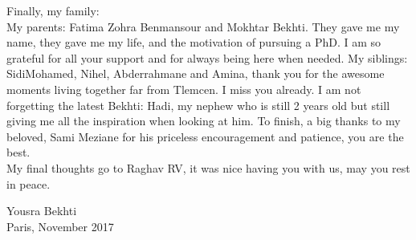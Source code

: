 \begin{acknowledgements}
Finally, my family: \\
My parents: Fatima Zohra Benmansour and Mokhtar Bekhti. They gave me my name, they gave me my life, and the motivation of pursuing a PhD. I am so grateful for all your support and for always being here when needed. My siblings: SidiMohamed, Nihel, Abderrahmane and Amina, thank you for the awesome moments living together far from Tlemcen. I miss you already. I am not forgetting the latest Bekhti: Hadi, my nephew who is still 2 years old but still giving me all the inspiration when looking at him. To finish, a big thanks to my beloved, Sami Meziane for his priceless encouragement and patience, you are the best.\\

My final thoughts go to Raghav RV, it was nice having you with us, may you rest in peace.

{\raggedleft Yousra Bekhti\\}
{\raggedleft Paris, November 2017\\}
\end{acknowledgements}